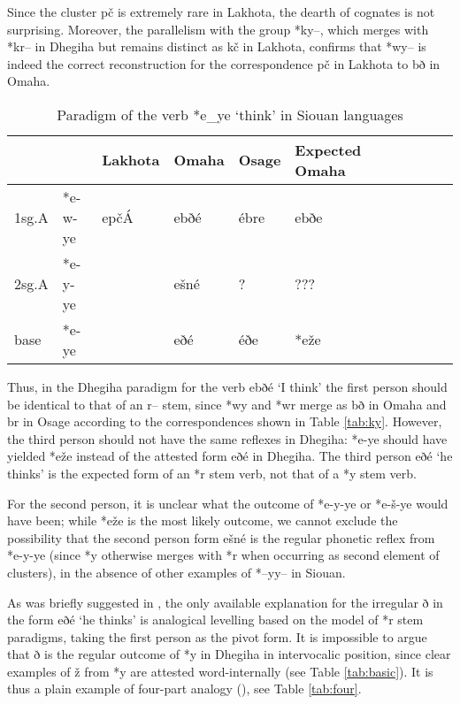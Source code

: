 \documentclass[oneside,a4paper,11pt]{article}
\newcommand{\ipa}[1]{{\phon#1}} %
\newcommand{\grise}[1]{\cellcolor{lightgray}\textbf{#1}}
\begin{document}
 Since the cluster \ipa{pč} is extremely rare in Lakhota, the dearth of cognates is not surprising. Moreover, the parallelism with the group *\ipa{ky--}, which merges with *\ipa{kr--} in Dhegiha but remains distinct as \ipa{kč} in Lakhota, confirms that *\ipa{wy--} is indeed the correct reconstruction for the correspondence \ipa{pč} in Lakhota to \ipa{bð} in Omaha.
 
 \begin{table}[h]
\caption{Paradigm of the verb *\ipa{e\_ye} `think' in Siouan languages}  \label{tab:think} \centering
\begin{tabular}{ll|l|ll|llll|ll}
\toprule
 &	 &	Lakhota &	 	Omaha &	Osage 	& Expected Omaha\\	
 \midrule
1sg.A &	*\ipa{e-w-ye} &	 \ipa{epčÁ} &   \ipa{ebðé} &\ipa{ébre} &\ipa{ebðe}\\
2sg.A &*\ipa{e-y-ye}&  &  \ipa{ešné} &? &???& \\
base &	*\ipa{e-ye} &	  &\ipa{eðé} &\ipa{éðe} & *\ipa{eže}\grise{}\\
\bottomrule			
\end{tabular}
\end{table} 

 Thus, in the Dhegiha paradigm for the verb \ipa{ebðé} `I think'     the first person should  be identical to that of an \ipa{r--} stem, since *\ipa{wy} and *\ipa{wr} merge as \ipa{bð} in Omaha and \ipa{br} in Osage according to the correspondences shown in Table \ref{tab:ky}. However,  the third person should not have the same reflexes in Dhegiha:  *\ipa{e-ye} should have yielded *\ipa{eže} instead of the attested form \ipa{eðé} in Dhegiha. The third person \ipa{eðé}  `he thinks' is the expected  form of an *\ipa{r} stem verb, not that of a *\ipa{y} stem verb.
 
 
 For the second person, it is unclear what the outcome of *\ipa{e-y-ye} or *\ipa{e-š-ye} would have been; while  *\ipa{eže}  is the most likely outcome, we cannot exclude the possibility that the second person form  \ipa{ešné} is the regular phonetic reflex from  *\ipa{e-y-ye} (since *\ipa{y} otherwise merges with *\ipa{r} when occurring as second element of clusters), in the absence of other examples of *\ipa{--yy--} in Siouan.

As was briefly suggested in \citet{rankin15csd}, the only available explanation for the irregular \ipa{ð} in the form \ipa{eðé} `he thinks' is analogical levelling based on the model of *\ipa{r} stem paradigms, taking the first person as the pivot form. It is impossible to argue that \ipa{ð} is the regular outcome of *\ipa{y} in Dhegiha in intervocalic position, since clear examples of \ipa{ž} from *\ipa{y} are attested word-internally (see Table \ref{tab:basic}). It is thus a plain example of four-part analogy (\citealt[167-175]{hock91principles}), see Table \ref{tab:four}.
\end{document}
